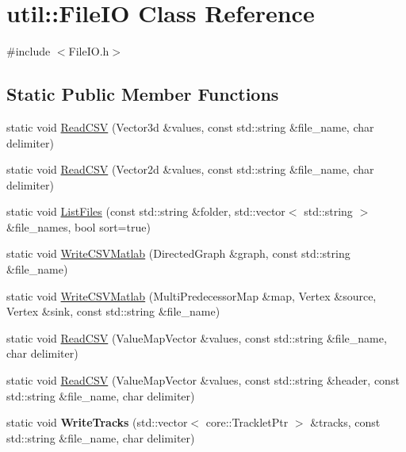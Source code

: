 \hypertarget{classutil_1_1FileIO}{}\section{util\+:\+:File\+IO Class Reference}
\label{classutil_1_1FileIO}


{\ttfamily \#include $<$File\+I\+O.\+h$>$}

\subsection*{Static Public Member Functions}
\begin{DoxyCompactItemize}
\item 
static void \hyperlink{classutil_1_1FileIO_ae31b9e693316483eda89df8463ea0d0a}{Read\+C\+SV} (Vector3d \&values, const std\+::string \&file\+\_\+name, char delimiter)
\item 
static void \hyperlink{classutil_1_1FileIO_a49f014af1e0f03d290f00049e082d9c6}{Read\+C\+SV} (Vector2d \&values, const std\+::string \&file\+\_\+name, char delimiter)
\item 
static void \hyperlink{classutil_1_1FileIO_a6e290e22083d49619b757bfca96a51fa}{List\+Files} (const std\+::string \&folder, std\+::vector$<$ std\+::string $>$ \&file\+\_\+names, bool sort=true)
\item 
static void \hyperlink{classutil_1_1FileIO_a5f2730a95e0801faa32e49dae9b86544}{Write\+C\+S\+V\+Matlab} (Directed\+Graph \&graph, const std\+::string \&file\+\_\+name)
\item 
static void \hyperlink{classutil_1_1FileIO_a2833554dcdf4a04f9fe67a324b5815ff}{Write\+C\+S\+V\+Matlab} (Multi\+Predecessor\+Map \&map, Vertex \&source, Vertex \&sink, const std\+::string \&file\+\_\+name)
\item 
static void \hyperlink{classutil_1_1FileIO_a642616eb6f07c71bd8dcb1585a532d92}{Read\+C\+SV} (Value\+Map\+Vector \&values, const std\+::string \&file\+\_\+name, char delimiter)
\item 
static void \hyperlink{classutil_1_1FileIO_a59b96733490d7b60e4f107da84efb245}{Read\+C\+SV} (Value\+Map\+Vector \&values, const std\+::string \&header, const std\+::string \&file\+\_\+name, char delimiter)
\item 
static void {\bfseries Write\+Tracks} (std\+::vector$<$ core\+::\+Tracklet\+Ptr $>$ \&tracks, const std\+::string \&file\+\_\+name, char delimiter)\hypertarget{classutil_1_1FileIO_a57059c9b52e86c753db5da6281cf23c6}{}\label{classutil_1_1FileIO_a57059c9b52e86c753db5da6281cf23c6}


\end{DoxyCompactItemize}
